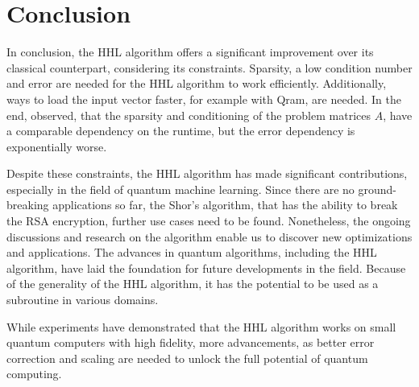 \section{Conclusion}

In conclusion, the HHL algorithm offers a significant improvement over its classical counterpart, considering its constraints.
Sparsity, a low condition number and error are needed for the HHL algorithm to work efficiently.
Additionally, ways to load the input vector faster, for example with Qram, are needed. 
In the end, observed, that the sparsity and conditioning of the problem matrices $A$, have a comparable dependency on the runtime, but the error dependency is exponentially worse. 

Despite these constraints, the HHL algorithm has made significant contributions, especially in the field of quantum machine learning. 
Since there are no ground-breaking applications so far, the Shor's algorithm, that has the ability to break the RSA encryption, further use cases need to be found.
Nonetheless, the ongoing discussions and research on the algorithm enable us to discover new optimizations and applications.
The advances in quantum algorithms, including the HHL algorithm, have laid the foundation for future developments in the field.
Because of the generality of the HHL algorithm, it has the potential to be used as a subroutine in various domains.

While experiments have demonstrated that the HHL algorithm works on small quantum computers with high fidelity, 
more advancements, as better error correction and scaling are needed to unlock the full potential of quantum computing.



